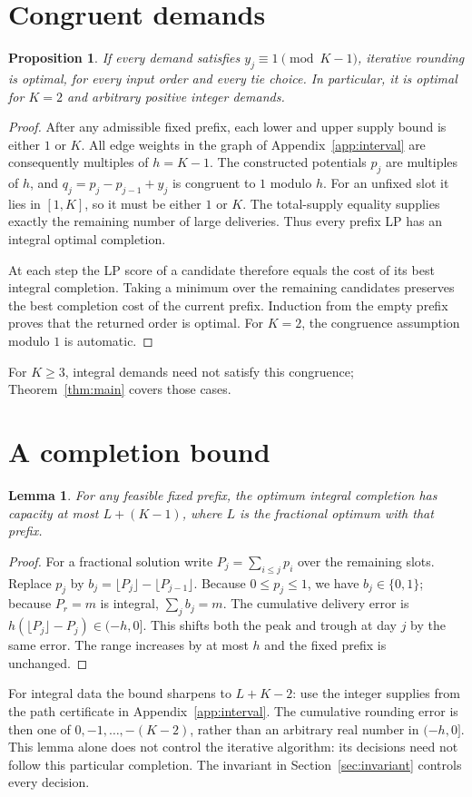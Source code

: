 \documentclass[11pt]{article}
\newtheorem{lemma}{Lemma}
\newtheorem{proposition}{Proposition}
\begin{document}
\section{Congruent demands}\label{app:congruent}
\begin{proposition}
If every demand satisfies $y_j\equiv1\pmod{K-1}$, iterative rounding is
optimal, for every input order and every tie choice. In particular, it is
optimal for $K=2$ and arbitrary positive integer demands.
\end{proposition}
\begin{proof}
After any admissible fixed prefix, each lower and upper supply bound is
either $1$ or $K$. All edge weights in the graph of
Appendix~\ref{app:interval} are consequently
multiples of $h=K-1$. The constructed potentials $p_j$ are multiples of $h$,
and $q_j=p_j-p_{j-1}+y_j$ is congruent to $1$ modulo $h$.
For an unfixed slot it lies in $[1,K]$, so it must be either $1$ or $K$.
The total-supply equality supplies exactly the remaining number of large
deliveries. Thus every prefix LP has an integral optimal completion.

At each step the LP score of a candidate therefore equals the cost of its
best integral completion. Taking a minimum over the remaining candidates
preserves the best completion cost of the current prefix. Induction from
the empty prefix proves that the returned order is optimal. For $K=2$, the
congruence assumption modulo $1$ is automatic.
\end{proof}
For $K\ge3$, integral demands need not satisfy this congruence;
Theorem~\ref{thm:main} covers those cases.

\section{A completion bound}\label{app:completion}
\begin{lemma}
For any feasible fixed prefix, the optimum integral completion has capacity
at most $L+(K-1)$, where $L$ is the fractional optimum with that prefix.
\end{lemma}
\begin{proof}
For a fractional solution write $P_j=\sum_{i\le j}p_i$ over the remaining slots.
Replace $p_j$ by $b_j=\lfloor P_j\rfloor-\lfloor P_{j-1}\rfloor$.
Because $0\le p_j\le1$, we have $b_j\in\{0,1\}$; because $P_r=m$ is integral,
$\sum_jb_j=m$. The cumulative delivery error is
$h(\lfloor P_j\rfloor-P_j)\in(-h,0]$. This shifts both the peak and trough
at day $j$ by the same error. The range increases by at most $h$ and the
fixed prefix is unchanged.
\end{proof}
For integral data the bound sharpens to $L+K-2$: use the integer supplies
from the path certificate in Appendix~\ref{app:interval}. The cumulative rounding error is then one of
$0,-1,\ldots,-(K-2)$, rather than an arbitrary real number in $(-h,0]$.
This lemma alone does not control the iterative algorithm: its decisions need
not follow this particular completion. The invariant in Section~\ref{sec:invariant} controls every decision.
\end{document}
